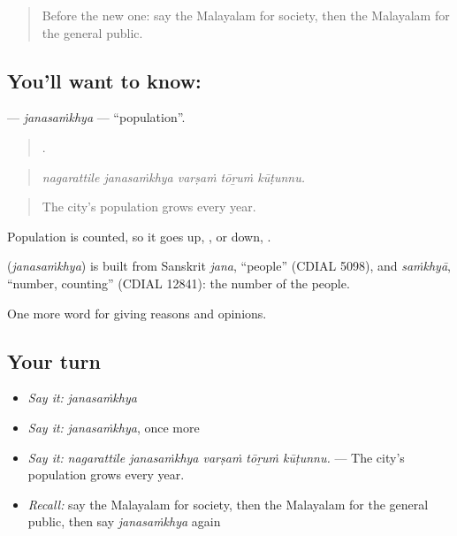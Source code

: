 \label{lesson:ML-C415-janasamkhya}



\begin{quote}
Before the new one: say the Malayalam for society, then the Malayalam for the general public.
\end{quote}

\subsection*{You'll want to know: }
\textbf{} — \emph{janasaṁkhya} — \textquotedblleft{}population\textquotedblright{}.

\begin{quote}
    .
\end{quote}

\begin{quote}
\emph{nagarattile janasaṁkhya varṣaṁ tōṟuṁ kūṭunnu.}
\end{quote}

\begin{quote}
The city's population grows every year.
\end{quote}

Population is counted, so it goes up, , or down, .

\begin{cousinweb}
\textbf{} (\emph{janasaṁkhya}) is built from Sanskrit \emph{jana}, \textquotedblleft{}people\textquotedblright{} (CDIAL 5098), and \emph{saṁkhyā}, \textquotedblleft{}number, counting\textquotedblright{} (CDIAL 12841): the number of the people.
\end{cousinweb}

\begin{grammarlens}[title={What you've built}]
One more word for giving reasons and opinions.
\end{grammarlens}

\subsection*{Your turn}
\begin{itemize}
\raggedright
  \item \emph{Say it:} \emph{janasaṁkhya}
  \item \emph{Say it:} \emph{janasaṁkhya}, once more
  \item \emph{Say it:} \emph{nagarattile janasaṁkhya varṣaṁ tōṟuṁ kūṭunnu.} — The city's population grows every year.
  \item \emph{Recall:} say the Malayalam for society, then the Malayalam for the general public, then say \emph{janasaṁkhya} again
\end{itemize}

